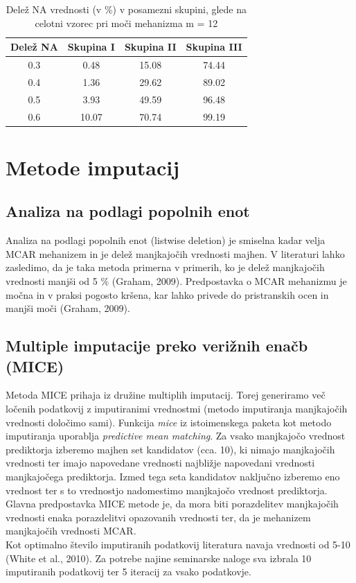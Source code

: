 \documentclass[12pt,a4paper]{article}
\begin{document}
	
\begin{table}[ht]
	\begin{tabular}{cccc}
		Delež NA & Skupina I & Skupina II  &  Skupina III  \\
		\hline
    0.3 & 0.48 & 15.08 & 74.44\\
    0.4 & 1.36 & 29.62 & 89.02\\
    0.5 & 3.93 & 49.59 & 96.48\\
    0.6 & 10.07 & 70.74 & 99.19\\
	\end{tabular}
	\caption{Delež NA vrednosti (v \%) v posamezni skupini, glede na celotni vzorec pri moči mehanizma m = 12}
	\label{tab:4}
\end{table}


\pagebreak

\section{Metode imputacij}

\subsection{Analiza na podlagi popolnih enot}
Analiza na podlagi popolnih enot (listwise deletion) je smiselna kadar velja MCAR mehanizem in je delež manjkajočih vrednosti majhen. V literaturi lahko zasledimo, da je taka metoda primerna v primerih, ko je delež manjkajočih vrednosti manjši od 5 \% (Graham, 2009). Predpostavka o MCAR mehanizmu je močna in v praksi pogosto kršena, kar lahko privede do pristranskih ocen in manjši moči (Graham, 2009).



\subsection{Multiple imputacije preko verižnih enačb (MICE)}
Metoda MICE prihaja iz družine multiplih imputacij. Torej generiramo več ločenih podatkovij z imputiranimi vrednostmi (metodo imputiranja manjkajočih vrednosti določimo sami). Funkcija \emph{mice} iz istoimenskega paketa kot metodo imputiranja uporablja \emph{predictive mean matching}. Za vsako manjkajočo vrednost prediktorja izberemo majhen set kandidatov (cca. 10), ki nimajo manjkajočih vrednosti ter imajo napovedane vrednosti najbližje napovedani vrednosti manjkajočega prediktorja. Izmed tega seta kandidatov naključno izberemo eno vrednost ter s to vrednostjo nadomestimo manjkajočo vrednost prediktorja. Glavna predpostavka MICE metode je, da mora biti porazdelitev manjkajočih vrednosti enaka porazdelitvi opazovanih vrednosti ter, da je mehanizem manjkajočih vrednosti MCAR.\\
Kot optimalno število imputiranih podatkovij literatura navaja vrednosti od 5-10 (White et al., 2010). Za potrebe najine seminarske naloge sva izbrala 10 imputiranih podatkovij ter 5 iteracij za vsako podatkovje.
\end{document}
